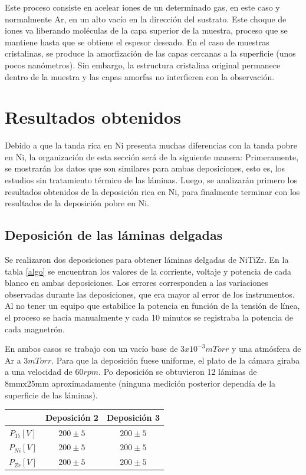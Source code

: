 \documentclass{article}
\theoremstyle{definition}
\theoremstyle{remark}
\begin{document}
Este proceso consiste en acelear iones de un determinado gas, en este caso y normalmente Ar, en un alto vacío en la dirección del sustrato. Este choque de iones va liberando moléculas de la capa superior de la muestra, proceso que se mantiene hasta que se obtiene el espesor deseado. En el caso de muestras cristalinas, se produce la amorfización de las capas cercanas a la superficie (unos pocos nanómetros). Sin embargo, la estructura cristalina original permanece dentro de la muestra y las capas amorfas no interfieren con la observación.


\section{Resultados obtenidos}
Debido a que la tanda rica en Ni presenta muchas diferencias con la tanda pobre en Ni, la organización de esta sección será de la siguiente manera: Primeramente, se mostrarán los datos que son similares para ambas deposiciones, esto es, los estudios sin tratamiento térmico de las láminas. Luego, se analizarán primero los resultados obtenidos de la deposición rica en Ni, para finalmente terminar con los resultados de la deposición pobre en Ni.
\subsection{Deposición de las láminas delgadas}
Se realizaron dos deposiciones para obtener láminas delgadas de NiTiZr. En la tabla \ref{algo} se encuentran los valores de la corriente, voltaje y potencia de cada blanco en ambas deposiciones. Los errores corresponden a las variaciones observadas durante las deposiciones, que era mayor al error de los instrumentos. Al no tener un equipo que estabilice la potencia en función de la tensión de línea, el proceso se hacía manualmente y cada 10 minutos se registraba la potencia de cada magnetrón.

En ambos casos se trabajo con un vacío base de $3 x 10^{-3}mTorr$ y una atmósfera de Ar a $3 mTorr$. Para que la deposición fuese uniforme, el plato de la cámara giraba a una velocidad de $60 rpm$. Po deposición se obtuvieron 12 láminas de 8mmx25mm aproximadamente (ninguna medición posterior dependía de la superficie de las láminas).

\begin{table}[H]
\centering
\begin{tabular}{|c|c|c|}
\hline
 & Deposición 2 & Deposición 3 \\ \hline
$P_{Ti}[V]$ & $200 \pm 5$ & $200 \pm 5$ \\ \hline
$P_{Ni}[V]$ & $200 \pm 5$ & $200 \pm 5$ \\ \hline
$P_{Zr}[V]$ & $200 \pm 5$ & $200 \pm 5$ \\ \hline
\end{tabular}
\end{table}
\end{document}

